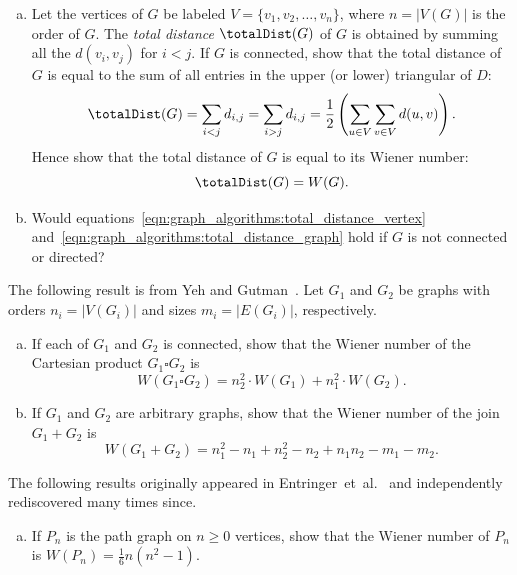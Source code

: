 \begin{problem}
\begin{enumerate}[(a)]
  \item Let the vertices of $G$ be labeled
    $V = \{v_1, v_2, \dots, v_n\}$, where $n = |V(G)|$ is the order of
    $G$. The \emph{total distance}
    $\totalDist(G)$ of $G$ is obtained by summing all the
    $d(v_i, v_j)$ for $i < j$. If $G$ is connected, show that the
    total distance of $G$ is equal to the sum of all entries in the
    upper (or lower) triangular of $D$:
    \begin{equation}
    \label{eqn:graph_algorithms:total_distance_graph}
    \totalDist(G)
    =
    \sum_{i < j} d_{i,j}
    =
    \sum_{i > j} d_{i,j}
    =
    \frac{1}{2} \left(\sum_{u \in V} \sum_{v \in V} d(u,v)\right).
    \end{equation}
    Hence show that the total distance of $G$ is equal to its Wiener
    number:
    \[
    \totalDist(G)
    =
    W(G).
    \]

  \item Would
    equations~\eqref{eqn:graph_algorithms:total_distance_vertex}
    and~\eqref{eqn:graph_algorithms:total_distance_graph} hold if $G$
    is not connected or directed?
  \end{enumerate}

\item The following result is from Yeh and
  Gutman~\cite{YehGutman1994}. Let $G_1$ and $G_2$ be graphs with
  orders $n_i = |V(G_i)|$ and sizes $m_i = |E(G_i)|$, respectively.
  \begin{enumerate}[(a)]
  \item If each of $G_1$ and $G_2$ is connected, show that the Wiener
    number of the Cartesian product $G_1 \square G_2$ is
    \[
    W(G_1 \square G_2)
    =
    n_2^2 \cdot W(G_1) + n_1^2 \cdot W(G_2).
    \]

  \item If $G_1$ and $G_2$ are arbitrary graphs, show that the Wiener
    number of the join $G_1 + G_2$ is
    \[
    W(G_1 + G_2)
    =
    n_1^2 - n_1 + n_2^2 - n_2 + n_1 n_2 - m_1 - m_2.
    \]
  \end{enumerate}

\item The following results originally appeared in
  Entringer~et~al.~\cite{EntringerEtAl1976} and independently
  rediscovered many times since.
  \begin{enumerate}[(a)]
  \item If $P_n$ is the path graph on $n \geq 0$ vertices, show that
    the Wiener number of $P_n$ is $W(P_n) = \frac{1}{6} n(n^2 - 1)$.


\end{enumerate}
\end{problem}
